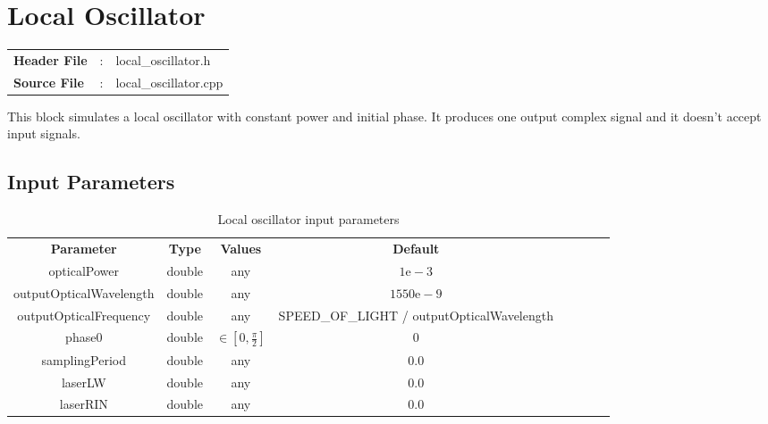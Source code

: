 \clearpage

\section{Local Oscillator}

\begin{tcolorbox}	
	\begin{tabular}{p{2.75cm} p{0.2cm} p{10.5cm}} 	
		\textbf{Header File}   &:& local\_oscillator.h \\
		\textbf{Source File}   &:& local\_oscillator.cpp \\
	\end{tabular}
\end{tcolorbox}

This block simulates a local oscillator with constant power and initial phase. It produces one output complex signal and it doesn't accept input signals.

\subsection*{Input Parameters}

\begin{table}[h]
	\centering
	\begin{tabular}{|c|c|c|c|cccc}
		\cline{1-4}
		\textbf{Parameter} & \textbf{Type} & \textbf{Values} &   \textbf{Default}& \\ \cline{1-4}
		opticalPower & double & any & $1\text{e}-3$ \\ \cline{1-4}
		outputOpticalWavelength & double & any & $1550\text{e}-9$ \\ \cline{1-4}
		outputOpticalFrequency & double & any &  SPEED\_OF\_LIGHT / outputOpticalWavelength \\ \cline{1-4}
		phase0 & double & $\in \left[0,\frac{\pi}{2}\right]$ & $0$ \\ \cline{1-4}
		samplingPeriod & double & any & $0.0$ \\ \cline{1-4}
        laserLW & double & any & $0.0$ \\ \cline{1-4}
        laserRIN & double & any & $0.0$ \\ \cline{1-4}
	\end{tabular}
	\caption{Local oscillator input parameters}
	\label{table:LO_in_par}
\end{table}

%

